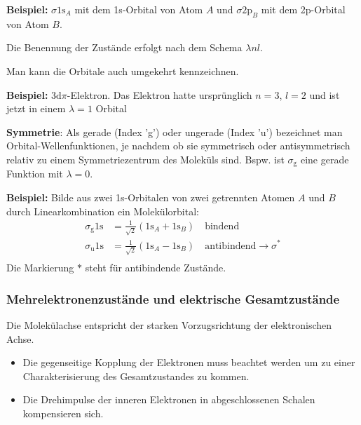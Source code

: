 \textbf{Beispiel:} $ \sigma 1 \mathrm{s}_{A}$ mit dem 1s-Orbital von Atom $A$ und $\sigma 2 \mathrm{p}_{B}$ mit dem 2p-Orbital von Atom $B$.
\begin{important}
	Die Benennung der Zustände erfolgt nach dem Schema $\lambda nl$. 
\end{important}
Man kann die Orbitale auch umgekehrt kennzeichnen.

\textbf{Beispiel:} $3\mathrm{d} \pi$-Elektron. Das Elektron hatte ursprünglich $n=3$, $l=2$ und ist jetzt in einem $\lambda=1$ Orbital

\textbf{Symmetrie}: Als gerade (Index 'g') oder ungerade (Index 'u') bezeichnet man Orbital-Wellenfunktionen, je nachdem ob sie symmetrisch oder antisymmetrisch relativ zu einem Symmetriezentrum des Moleküls sind. Bspw. ist $ \sigma_{\mathrm{g}}$ eine gerade Funktion mit $ \lambda =0$.

\textbf{Beispiel:} Bilde aus zwei 1s-Orbitalen von zwei getrennten Atomen $A$ und $B$ durch Linearkombination ein Molekülorbital:
$$
\begin{aligned}
	\sigma_{\mathrm{g}} 1\mathrm{s} &= \frac{1}{\sqrt{2} } \left( 1\mathrm{s}_{A} + 1\mathrm{s}_{B}\right) \quad \text{bindend} \\
	\sigma_{\mathrm{u}} 1\mathrm{s} &= \frac{1}{\sqrt{2} } \left( 1\mathrm{s}_{A} - 1\mathrm{s}_{B} \right) \quad \text{antibindend} \to \sigma^{*} \\
\end{aligned}
$$ 
Die Markierung $*$ steht für antibindende Zustände.

\subsubsection{Mehrelektronenzustände und elektrische Gesamtzustände}
Die Molekülachse entspricht der starken Vorzugsrichtung der elektronischen Achse.
\begin{itemize}
	\item Die gegenseitige Kopplung der Elektronen muss beachtet werden um zu einer Charakterisierung des Gesamtzustandes zu kommen.
	\item Die Drehimpulse der inneren Elektronen in abgeschlossenen Schalen kompensieren sich.
\end{itemize}

